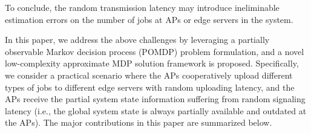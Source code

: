 To conclude, the random transmission latency may introduce ineliminable estimation errors on the number of jobs at APs or edge servers in the system.


In this paper, we address the above challenges by leveraging a partially observable Markov decision process (POMDP) problem formulation, and a novel low-complexity approximate MDP solution framework is proposed.
Specifically, we consider a practical scenario where the APs cooperatively upload different types of jobs to different edge servers with random uploading latency, and the APs receive the partial system state information suffering from random signaling latency (i.e., the global system state is always partially available and outdated at the APs).
The major contributions in this paper are summarized below.
